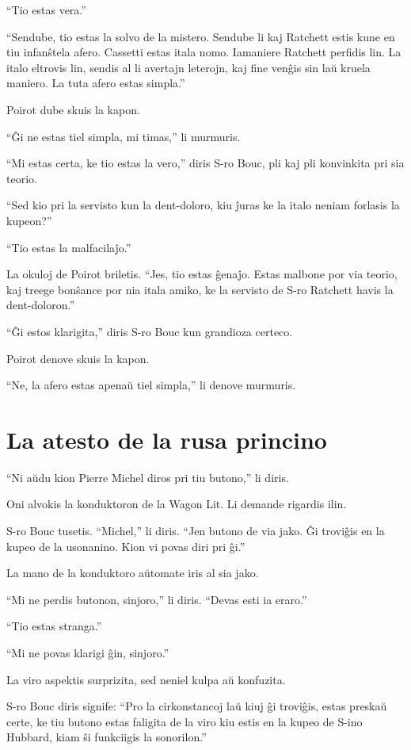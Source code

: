 ``Tio estas vera.''

``Sendube, tio estas la solvo de la mistero. Sendube li kaj Ratchett estis kune en tiu infanŝtela afero. Cassetti estas itala nomo. Iamaniere Ratchett perfidis lin. La italo eltrovis lin, sendis al li avertajn leterojn, kaj fine venĝis sin laŭ kruela maniero. La tuta afero estas simpla.''

Poirot dube skuis la kapon.

``Ĝi ne estas tiel simpla, mi timas,'' li murmuris.

``Mi estas certa, ke tio estas la vero,'' diris S-ro Bouc, pli kaj pli konvinkita pri sia teorio.

``Sed kio pri la servisto kun la dent-doloro, kiu ĵuras ke la italo neniam forlasis la kupeon?''

``Tio estas la malfacilaĵo.''

La okuloj de Poirot briletis. ``Jes, tio estas ĝenaĵo. Estas malbone por via teorio, kaj treege bonŝance por nia itala amiko, ke la servisto de S-ro Ratchett havis la dent-doloron.''

``Ĝi estos klarigita,'' diris S-ro Bouc kun grandioza certeco.

Poirot denove skuis la kapon.

``Ne, la afero estas apenaŭ tiel simpla,'' li denove murmuris.

\chapter[La atesto de la rusa princino]{La atesto de la rusa princino}


``Ni aŭdu kion Pierre Michel diros pri tiu butono,'' li diris.

Oni alvokis la konduktoron de la Wagon Lit. Li demande rigardis ilin.

S-ro Bouc tusetis. ``Michel,'' li diris. ``Jen butono de via jako. Ĝi troviĝis en la kupeo de la usonanino. Kion vi povas diri pri ĝi.''

La mano de la konduktoro aŭtomate iris al sia jako.

``Mi ne perdis butonon, sinjoro,'' li diris. ``Devas esti ia eraro.''

``Tio estas stranga.''

``Mi ne povas klarigi ĝin, sinjoro.''

La viro aspektis surprizita, sed neniel kulpa aŭ konfuzita.

S-ro Bouc diris signife: ``Pro la cirkonstancoj laŭ kiuj ĝi troviĝis, estas preskaŭ certe, ke tiu butono estas faligita de la viro kiu estis en la kupeo de S-ino Hubbard, kiam ŝi funkciigis la sonorilon.''


